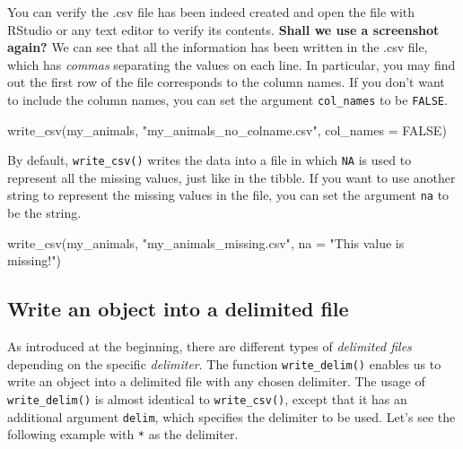 \documentclass[
]{book}
\newenvironment{Shaded}{\begin{snugshade}}{\end{snugshade}}
\newcommand{\AttributeTok}[1]{\textcolor[rgb]{0.77,0.63,0.00}{#1}}
\newcommand{\ConstantTok}[1]{\textcolor[rgb]{0.00,0.00,0.00}{#1}}
\newcommand{\FunctionTok}[1]{\textcolor[rgb]{0.00,0.00,0.00}{#1}}
\newcommand{\NormalTok}[1]{#1}
\newcommand{\StringTok}[1]{\textcolor[rgb]{0.31,0.60,0.02}{#1}}
\begin{document}
You can verify the .csv file has been indeed created and open the file with RStudio or any text editor to verify its contents. \textbf{Shall we use a screenshot again?}
We can see that all the information has been written in the .csv file, which has \emph{commas} separating the values on each line. In particular, you may find out the first row of the file corresponds to the column names. If you don't want to include the column names, you can set the argument \texttt{col\_names} to be \texttt{FALSE}.

\begin{Shaded}
\begin{Highlighting}[]
\FunctionTok{write\_csv}\NormalTok{(my\_animals, }\StringTok{"my\_animals\_no\_colname.csv"}\NormalTok{, }\AttributeTok{col\_names =} \ConstantTok{FALSE}\NormalTok{)}
\end{Highlighting}
\end{Shaded}

By default, \texttt{write\_csv()} writes the data into a file in which \texttt{NA} is used to represent all the missing values, just like in the tibble. If you want to use another string to represent the missing values in the file, you can set the argument \texttt{na} to be the string.

\begin{Shaded}
\begin{Highlighting}[]
\FunctionTok{write\_csv}\NormalTok{(my\_animals, }\StringTok{"my\_animals\_missing.csv"}\NormalTok{, }\AttributeTok{na =} \StringTok{"This value is missing!"}\NormalTok{)}
\end{Highlighting}
\end{Shaded}

\hypertarget{write-an-object-into-a-delimited-file}{%
\subsection{Write an object into a delimited file}\label{write-an-object-into-a-delimited-file}}

As introduced at the beginning, there are different types of \emph{delimited files} depending on the specific \emph{delimiter}. The function \texttt{write\_delim()} enables us to write an object into a delimited file with any chosen delimiter. The usage of \texttt{write\_delim()} is almost identical to \texttt{write\_csv()}, except that it has an additional argument \texttt{delim}, which specifies the delimiter to be used. Let's see the following example with \texttt{*} as the delimiter.
\end{document}
